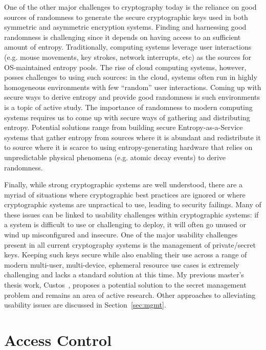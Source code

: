 \documentclass{sig-alternate}
\begin{document}
One of the other major challenges to cryptography today is the
reliance on good sources of randomness to generate the secure
cryptographic keys used in both symmetric and asymmetric encryption
systems. Finding and harnessing good randomness is challenging since
it depends on having access to an sufficient amount of
entropy. Traditionally, computing systems leverage user interactions
(e.g. mouse movements, key strokes, network interrupts, etc) as the
sources for OS-maintained entropy pools. The rise of cloud computing
systems, however, posses challenges to using such sources: in the
cloud, systems often run in highly homogeneous environments with few
``random'' user interactions. Coming up with secure ways to derive
entropy and provide good randomness is such environments is a topic of
active study. The importance of randomness to modern computing systems
requires us to come up with secure ways of gathering and distributing
entropy. Potential solutions range from building secure
Entropy-as-a-Service systems that gather entropy from sources where it
is abundant and redistribute it to source where it is scarce to using
entropy-generating hardware that relies on unpredictable physical
phenomena (e.g. atomic decay events) to derive randomness.

Finally, while strong cryptographic systems are well understood, there
are a myriad of situations where cryptographic best practices are
ignored or where cryptographic systems are unpractical to use, leading
to security failings. Many of these issues can be linked to usability
challenges within cryptographic systems: if a system is difficult to
use or challenging to deploy, it will often go unused or wind up
misconfigured and insecure. One of the major usability challenges
present in all current cryptography systems is the management of
private/secret keys. Keeping such keys secure while also enabling
their use across a range of modern multi-user, multi-device, ephemeral
resource use cases is extremely challenging and lacks a standard
solution at this time. My previous master's thesis work,
Custos~\cite{custos-masters}, proposes a potential solution to the
secret management problem and remains an area of active
research. Other approaches to alleviating usability issues are
discussed in Section~\ref{sec:mgmt}.

\section{Access Control}
\label{sec:ac}
\end{document}
